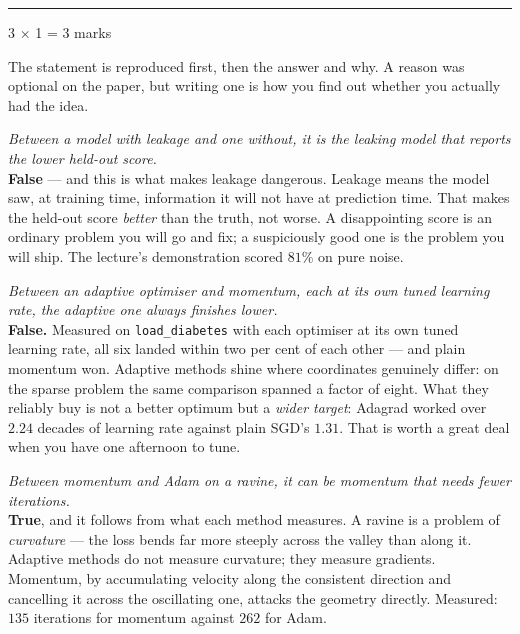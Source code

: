 \documentclass[10pt,a4paper]{article}
\newcommand{\parthead}[2]{\vspace{2pt}\noindent\rule{\linewidth}{0.4pt}\par\vspace{2pt}%
  \noindent{\bfseries Part #1}\hfill{\small #2}\par\vspace{1pt}}
\begin{document}
\newpage

\parthead{C --- True or false}{3 $\times$ 1 = 3 marks}

{\small The statement is reproduced first, then the answer and why. A reason was optional on the paper, but writing one is how you find out whether you actually had the idea.}

\begin{sC}

  \item \emph{Between a model with leakage and one without, it is the leaking model that reports the \emph{lower} held-out score.}\\[2pt] \textbf{False} --- and this is what makes leakage dangerous. Leakage means the model saw, at training time, information it will not have at prediction time. That makes the held-out score \emph{better} than the truth, not worse. A disappointing score is an ordinary problem you will go and fix; a suspiciously good one is the problem you will ship. The lecture's demonstration scored $81\%$ on pure noise.

  \item \emph{Between an adaptive optimiser and momentum, each at its own tuned learning rate, the adaptive one always finishes lower.}\\[2pt] \textbf{False.} Measured on \texttt{load\_diabetes} with each optimiser at its own tuned learning rate, all six landed within two per cent of each other --- and plain momentum won. Adaptive methods shine where coordinates genuinely differ: on the sparse problem the same comparison spanned a factor of eight. What they reliably buy is not a better optimum but a \emph{wider target}: Adagrad worked over $2.24$ decades of learning rate against plain SGD's $1.31$. That is worth a great deal when you have one afternoon to tune.

  \item \emph{Between momentum and Adam on a ravine, it can be momentum that needs fewer iterations.}\\[2pt] \textbf{True}, and it follows from what each method measures. A ravine is a problem of \emph{curvature} --- the loss bends far more steeply across the valley than along it. Adaptive methods do not measure curvature; they measure gradients. Momentum, by accumulating velocity along the consistent direction and cancelling it across the oscillating one, attacks the geometry directly. Measured: $135$ iterations for momentum against $262$ for Adam.

\end{sC}
\end{document}
